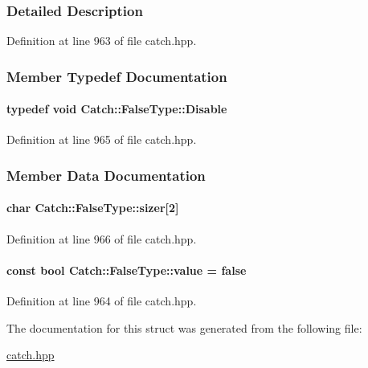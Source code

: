 \subsubsection{Detailed Description}


Definition at line 963 of file catch.\+hpp.



\subsubsection{Member Typedef Documentation}
\hypertarget{a00029_a9b1d652f081c774bdaea5d061bb3372c}{}
\paragraph[{Disable}]{\setlength{\rightskip}{0pt plus 5cm}typedef void {\bf Catch\+::\+False\+Type\+::\+Disable}}\label{a00029_a9b1d652f081c774bdaea5d061bb3372c}


Definition at line 965 of file catch.\+hpp.



\subsubsection{Member Data Documentation}
\hypertarget{a00029_ad0a0468edb767e93e12459b816a89a88}{}
\paragraph[{sizer}]{\setlength{\rightskip}{0pt plus 5cm}char Catch\+::\+False\+Type\+::sizer\mbox{[}2\mbox{]}}\label{a00029_ad0a0468edb767e93e12459b816a89a88}


Definition at line 966 of file catch.\+hpp.

\hypertarget{a00029_a34974ab2e06c898a360ba5f3b2d9ebe3}{}
\paragraph[{value}]{\setlength{\rightskip}{0pt plus 5cm}const bool Catch\+::\+False\+Type\+::value = false\hspace{0.3cm}{\ttfamily [static]}}\label{a00029_a34974ab2e06c898a360ba5f3b2d9ebe3}


Definition at line 964 of file catch.\+hpp.



The documentation for this struct was generated from the following file\+:\begin{DoxyCompactItemize}
\item 
\hyperlink{a00094}{catch.\+hpp}\end{DoxyCompactItemize}

